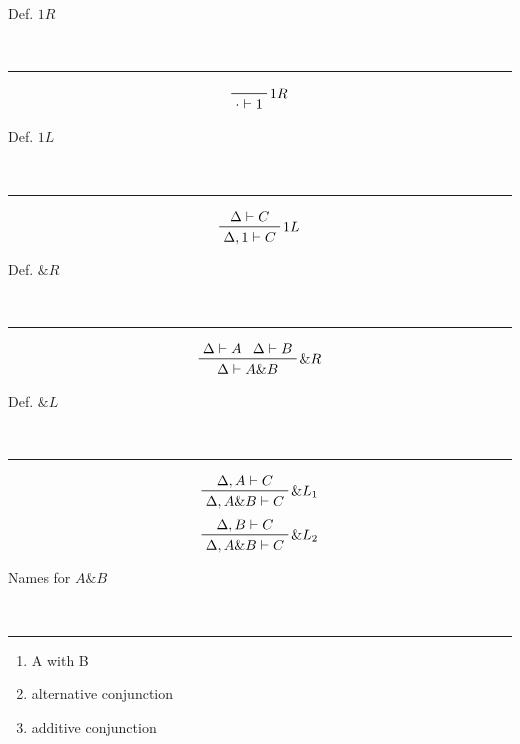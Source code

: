 \begin{note}
  \begin{field}
    Def. $1 R$
  \end{field} \\
  \noindent\rule[0.5ex]{\linewidth}{1pt}
  \begin{field}
    \[ 
      \prftree[r]
      {$1 R$}
      {\cdot\vdash 1}
    \] 
  \end{field}
\end{note}

\begin{note}
  \begin{field}
    Def. $1 L$
  \end{field} \\
  \noindent\rule[0.5ex]{\linewidth}{1pt}
  \begin{field}
    \[
      \prftree[r]
      {$1 L$}
      {\Delta\vdash C}
      {\Delta,1\vdash C}
    \]
  \end{field}
\end{note}

\begin{note}
  \begin{field}
    Def. $\&R$
  \end{field} \\
  \noindent\rule[0.5ex]{\linewidth}{1pt}
  \begin{field}
    \[
      \prftree[r]
      {$\&R$}
      {\Delta\vdash A}
      {\Delta\vdash B}
      {\Delta\vdash A\& B}
    \]
  \end{field}
\end{note}

\begin{note}
  \begin{field}
    Def. $\& L$
  \end{field} \\
  \noindent\rule[0.5ex]{\linewidth}{1pt}
  \begin{field}
    \[
      \prftree[r]
      {$\&L_1$}
      {\Delta, A\vdash C}
      {\Delta, A\&B\vdash C}
    \]
    \[
      \prftree[r]
      {$\&L_2$}
      {\Delta, B\vdash C}
      {\Delta, A\&B\vdash C}
    \]
  \end{field}
\end{note}

\begin{note}
  \begin{field}
    Names for $A\& B$
  \end{field} \\
  \noindent\rule[0.5ex]{\linewidth}{1pt}
  \begin{field}
    \begin{enumerate}
      \item A with B
      \item alternative conjunction
      \item additive conjunction
    \end{enumerate}
  \end{field}
\end{note}

